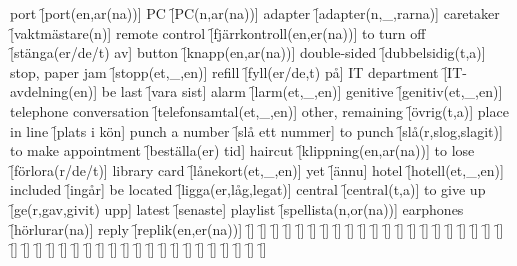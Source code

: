 \begin{questions}
\begin{multicols}{2}
        \question port \f[port(en,ar(na))]
        \question PC \f[PC(n,ar(na))]
        \question adapter \f[adapter(n,\_,rarna)]
        \question caretaker \f[vaktmästare(n)]
        \question remote control \f[fjärrkontroll(en,er(na))]
        \question to turn off \f[stänga(er/de/t) av]
        \question button \f[knapp(en,ar(na))]
        \question double-sided \f[dubbelsidig(t,a)]
        \question stop, paper jam \f[stopp(et,\_,en)]
        \question refill \f[fyll(er/de,t) på]
        \question IT department \f[IT-avdelning(en)]
        \question be last \f[vara sist]
        \question alarm \f[larm(et,\_,en)]
        \question genitive \f[genitiv(et,\_,en)]
        \question telephone conversation \f[telefonsamtal(et,\_,en)]
        \question other, remaining \f[övrig(t,a)]
        \question place in line \f[plats i kön]
        \question punch a number \f[slå ett nummer]
        \question to punch \f[slå(r,slog,slagit)]
        \question to make appointment \f[beställa(er) tid]
        \question haircut \f[klippning(en,ar(na))]
        \question to lose \f[förlora(r/de/t)]
        \question library card \f[lånekort(et,\_,en)]
        \question yet \f[ännu]
        \question hotel \f[hotell(et,\_,en)]
        \question included \f[ingår]
        \question be located \f[ligga(er,låg,legat)]
        \question central \f[central(t,a)]
        \question to give up \f[ge(r,gav,givit) upp]
        \question latest \f[senaste]
        \question playlist \f[spellista(n,or(na))]
        \question earphones \f[hörlurar(na)]
        \question reply \f[replik(en,er(na))]
        \question  \f[]
        \question  \f[]
        \question  \f[]
        \question  \f[]
        \question  \f[]
        \question  \f[]
        \question  \f[]
        \question  \f[]
        \question  \f[]
        \question  \f[]
        \question  \f[]
        \question  \f[]
        \question  \f[]
        \question  \f[]
        \question  \f[]
        \question  \f[]
        \question  \f[]
        \question  \f[]
        \question  \f[]
        \question  \f[]
        \question  \f[]
        \question  \f[]
        \question  \f[]
        \question  \f[]
        \question  \f[]
        \question  \f[]
        \question  \f[]
        \question  \f[]
        \question  \f[]
        \question  \f[]
        \question  \f[]
        \question  \f[]
        \question  \f[]
        \question  \f[]
        \question  \f[]
        \question  \f[]
        \question  \f[]
        \question  \f[]
        \question  \f[]
        \question  \f[]
        \question  \f[]
        \question  \f[]

\end{multicols}
\end{questions}
